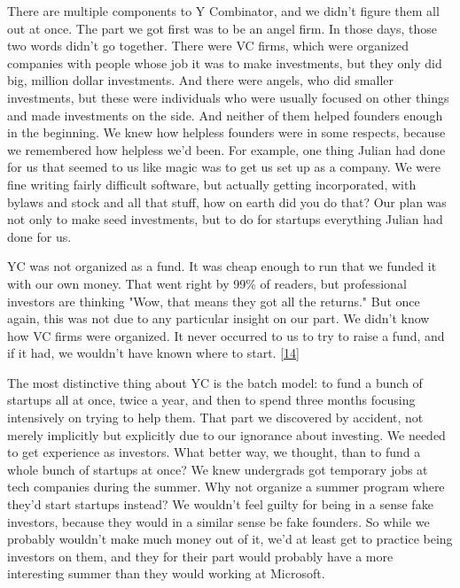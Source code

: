 There are multiple components to Y
                  Combinator, and we didn't figure them all out at once. The
                  part we got first was to be an angel firm. In those days,
                  those two words didn't go together. There were VC firms, which
                  were organized companies with people whose job it was to make
                  investments, but they only did big, million dollar
                  investments. And there were angels, who did smaller
                  investments, but these were individuals who were usually
                  focused on other things and made investments on the side. And
                  neither of them helped founders enough in the beginning. We
                  knew how helpless founders were in some respects, because we
                  remembered how helpless we'd been. For example, one thing
                  Julian had done for us that seemed to us like magic was to get
                  us set up as a company. We were fine writing fairly difficult
                  software, but actually getting incorporated, with bylaws and
                  stock and all that stuff, how on earth did you do that? Our
                  plan was not only to make seed investments, but to do for
                  startups everything Julian had done for us.

YC was
                  not organized as a fund. It was cheap enough to run that we
                  funded it with our own money. That went right by 99\% of
                  readers, but professional investors are thinking "Wow, that
                  means they got all the returns." But once again, this was not
                  due to any particular insight on our part. We didn't know how
                  VC firms were organized. It never occurred to us to try to
                  raise a fund, and if it had, we wouldn't have known where to
                  start.
                  [\href{\#f14n}{14}]

The most distinctive thing about YC is the batch
                  model: to fund a bunch of startups all at once, twice a year,
                  and then to spend three months focusing intensively on trying
                  to help them. That part we discovered by accident, not merely
                  implicitly but explicitly due to our ignorance about
                  investing. We needed to get experience as investors. What
                  better way, we thought, than to fund a whole bunch of startups
                  at once? We knew undergrads got temporary jobs at tech
                  companies during the summer. Why not organize a summer program
                  where they'd start startups instead? We wouldn't feel guilty
                  for being in a sense fake investors, because they would in a
                  similar sense be fake founders. So while we probably wouldn't
                  make much money out of it, we'd at least get to practice being
                  investors on them, and they for their part would probably have
                  a more interesting summer than they would working at
                  Microsoft.

